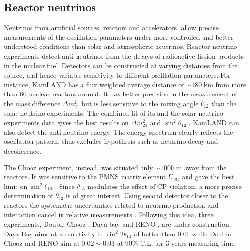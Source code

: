 \subsection{Reactor neutrinos}
\label{sec:reactor}
Neutrinos from artificial sources, reactors and accelerators, allow precise measurements of the oscillation parameters under more controlled and better understood conditions than solar and atmospheric neutrinos. Reactor neutrino experiments detect anti-neutrinos from the decays of radioactive fission products in the nuclear fuel. Detectors can be constructed at varying distances from the source, and hence variable sensitivity to different oscillation parameters. For instance, KamLAND \cite{Kam03} has a flux weighted average distance of $\sim180$ km from more than 60 nuclear reactors around. It has better precision in the measurement of the mass difference $\Delta m^{2}_{21}$ but is less sensitive to the mixing angle $\theta_{12}$ than the solar neutrino experiments. The combined fit of its and the solar neutrino experiments data gives the best results on $\Delta m^{2}_{21}$ and $\sin^{2}\theta_{12}$ \cite{Kam08}. KamLAND can also detect the anti-neutrino energy. The energy spectrum clearly reflects the oscillation pattern, thus excludes hypothesis such as neutrino decay and decoherence.

The Chooz experiment, instead, was situated only $\sim1000$ m away from the reactors. It was sensitive to the PMNS matrix element $U_{e3}$, and gave the best limit on $\sin^{2}\theta_{13}$ \cite{Cho03}. Since $\theta_{13}$ modulates the effect of CP violation, a more precise determination of $\theta_{13}$ is of great interest. Using second detector closer to the reactors the systematic uncertainties related to neutrino production and interaction cancel in relative measurements \cite{Koz03}. Following this idea, three experiments, Double Chooz \cite{Dbc06}, Daya bay \cite{Day07} and RENO \cite{Ren08}, are under construction. Daya Bay aims at a sensitivity in $\sin^{2}2\theta_{13}$ of better than 0.01 while Double Chooz and RENO aim at $0.02 \sim 0.03$ at $90\%$ C.L. for 3 years measuring time.

